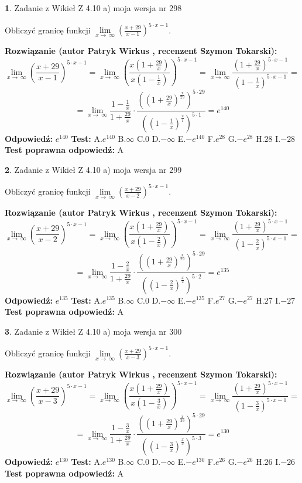 \documentclass[12pt, a4paper]{article}
\theoremstyle{definition} %
\newtheorem{zad}{}
\newcommand{\zadStart}[1]{\begin{zad}#1\newline}
\newcommand{\zadStop}{\end{zad}}
\newcommand{\rozwStart}[2]{\noindent \textbf{Rozwiązanie (autor #1 , recenzent #2): }\newline}
\newcommand{\rozwStop}{\newline}
\newcommand{\odpStart}{\noindent \textbf{Odpowiedź:}\newline}
\newcommand{\odpStop}{\newline}
\newcommand{\testStart}{\noindent \textbf{Test:}\newline}
\newcommand{\testStop}{\newline}
\newcommand{\kluczStart}{\noindent \textbf{Test poprawna odpowiedź:}\newline}
\newcommand{\kluczStop}{\newline}
\begin{document}
\zadStart{Zadanie z Wikieł Z 4.10 a) moja wersja nr 298}

Obliczyć granicę funkcji  $\lim\limits_{x\to\ \infty}(\frac{x+29}{x-1})^{5\cdot x-1}$.
\zadStop
\rozwStart{Patryk Wirkus}{Szymon Tokarski}
$$\lim\limits_{x\to\ \infty}(\frac{x+29}{x-1})^{5\cdot x-1} = \lim\limits_{x\to\ \infty}(\frac{x(1+\frac{29}{x})}{x(1-\frac{1}{x})})^{5\cdot x-1}=\lim\limits_{x\to\ \infty}\frac{(1+\frac{29}{x})^{5\cdot x-1}}{(1-\frac{1}{x})^{5\cdot x-1}}=$$
$$=\lim\limits_{x\to\ \infty}\frac{1-\frac{1}{x}}{1+\frac{29}{x}}\cdot\frac{((1+\frac{29}{x})^{\frac{x}{29}})^{5\cdot29}}{((1-\frac{1}{x})^{\frac{x}{1}})^{5\cdot1}}=e^{140}$$
\rozwStop
\odpStart
$e^{140}$
\odpStop
\testStart
A.$e^{140}$ B.$\infty$ C.$0$ D.$-\infty$ E.$-e^{140}$
F.$e^{28}$ G.$-e^{28}$
H.$28$
I.$-28$
\testStop
\kluczStart
A
\kluczStop



\zadStart{Zadanie z Wikieł Z 4.10 a) moja wersja nr 299}

Obliczyć granicę funkcji  $\lim\limits_{x\to\ \infty}(\frac{x+29}{x-2})^{5\cdot x-1}$.
\zadStop
\rozwStart{Patryk Wirkus}{Szymon Tokarski}
$$\lim\limits_{x\to\ \infty}(\frac{x+29}{x-2})^{5\cdot x-1} = \lim\limits_{x\to\ \infty}(\frac{x(1+\frac{29}{x})}{x(1-\frac{2}{x})})^{5\cdot x-1}=\lim\limits_{x\to\ \infty}\frac{(1+\frac{29}{x})^{5\cdot x-1}}{(1-\frac{2}{x})^{5\cdot x-1}}=$$
$$=\lim\limits_{x\to\ \infty}\frac{1-\frac{2}{x}}{1+\frac{29}{x}}\cdot\frac{((1+\frac{29}{x})^{\frac{x}{29}})^{5\cdot29}}{((1-\frac{2}{x})^{\frac{x}{2}})^{5\cdot2}}=e^{135}$$
\rozwStop
\odpStart
$e^{135}$
\odpStop
\testStart
A.$e^{135}$ B.$\infty$ C.$0$ D.$-\infty$ E.$-e^{135}$
F.$e^{27}$ G.$-e^{27}$
H.$27$
I.$-27$
\testStop
\kluczStart
A
\kluczStop



\zadStart{Zadanie z Wikieł Z 4.10 a) moja wersja nr 300}

Obliczyć granicę funkcji  $\lim\limits_{x\to\ \infty}(\frac{x+29}{x-3})^{5\cdot x-1}$.
\zadStop
\rozwStart{Patryk Wirkus}{Szymon Tokarski}
$$\lim\limits_{x\to\ \infty}(\frac{x+29}{x-3})^{5\cdot x-1} = \lim\limits_{x\to\ \infty}(\frac{x(1+\frac{29}{x})}{x(1-\frac{3}{x})})^{5\cdot x-1}=\lim\limits_{x\to\ \infty}\frac{(1+\frac{29}{x})^{5\cdot x-1}}{(1-\frac{3}{x})^{5\cdot x-1}}=$$
$$=\lim\limits_{x\to\ \infty}\frac{1-\frac{3}{x}}{1+\frac{29}{x}}\cdot\frac{((1+\frac{29}{x})^{\frac{x}{29}})^{5\cdot29}}{((1-\frac{3}{x})^{\frac{x}{3}})^{5\cdot3}}=e^{130}$$
\rozwStop
\odpStart
$e^{130}$
\odpStop
\testStart
A.$e^{130}$ B.$\infty$ C.$0$ D.$-\infty$ E.$-e^{130}$
F.$e^{26}$ G.$-e^{26}$
H.$26$
I.$-26$
\testStop
\kluczStart
A
\kluczStop
\end{document}
